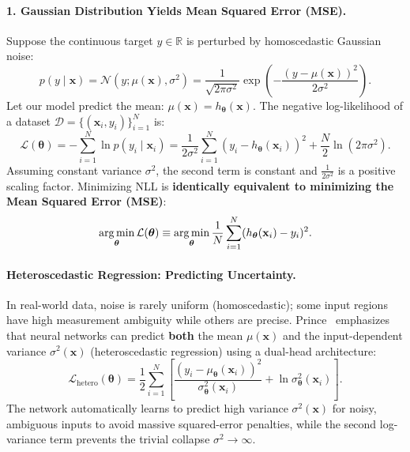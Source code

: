 \paragraph{1. Gaussian Distribution Yields Mean Squared Error (MSE).}
Suppose the continuous target $y \in \mathbb{R}$ is perturbed by homoscedastic Gaussian noise:
\begin{equation}
p(y \mid \mathbf{x}) = \mathcal{N}(y; \mu(\mathbf{x}), \sigma^2) = \frac{1}{\sqrt{2\pi \sigma^2}} \exp\left( -\frac{(y - \mu(\mathbf{x}))^2}{2\sigma^2} \right).
\end{equation}
Let our model predict the mean: $\mu(\mathbf{x}) = h_{\boldsymbol{\theta}}(\mathbf{x})$. The negative log-likelihood of a dataset $\mathcal{D} = \{(\mathbf{x}_i, y_i)\}_{i=1}^N$ is:
\begin{equation}
\mathcal{L}(\boldsymbol{\theta}) = -\sum_{i=1}^N \ln p(y_i \mid \mathbf{x}_i) = \frac{1}{2\sigma^2} \sum_{i=1}^N (y_i - h_{\boldsymbol{\theta}}(\mathbf{x}_i))^2 + \frac{N}{2} \ln(2\pi \sigma^2).
\end{equation}
Assuming constant variance $\sigma^2$, the second term is constant and $\frac{1}{2\sigma^2}$ is a positive scaling factor. Minimizing NLL is \textbf{identically equivalent to minimizing the Mean Squared Error (MSE)}:
\begin{equation}
\operatorname*{arg\,min}_{\boldsymbol{\theta}} \mathcal{L}(\boldsymbol{\theta}) \equiv \operatorname*{arg\,min}_{\boldsymbol{\theta}} \frac{1}{N} \sum_{i=1}^N (h_{\boldsymbol{\theta}}(\mathbf{x}_i) - y_i)^2.
\end{equation}

\paragraph{Heteroscedastic Regression: Predicting Uncertainty.}
In real-world data, noise is rarely uniform (homoscedastic); some input regions have high measurement ambiguity while others are precise. Prince~\cite{prince2023understanding} emphasizes that neural networks can predict \textbf{both} the mean $\mu(\mathbf{x})$ and the input-dependent variance $\sigma^2(\mathbf{x})$ (heteroscedastic regression) using a dual-head architecture:
\begin{equation}
\mathcal{L}_{\text{hetero}}(\boldsymbol{\theta}) = \frac{1}{2} \sum_{i=1}^N \left[ \frac{(y_i - \mu_{\boldsymbol{\theta}}(\mathbf{x}_i))^2}{\sigma^2_{\boldsymbol{\theta}}(\mathbf{x}_i)} + \ln \sigma^2_{\boldsymbol{\theta}}(\mathbf{x}_i) \right].
\label{eq:heteroscedastic_nll}
\end{equation}
The network automatically learns to predict high variance $\sigma^2(\mathbf{x})$ for noisy, ambiguous inputs to avoid massive squared-error penalties, while the second log-variance term prevents the trivial collapse $\sigma^2 \to \infty$.

